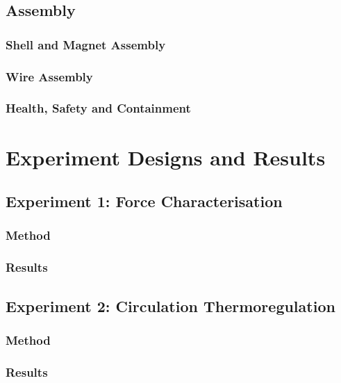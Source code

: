 \documentclass[a4paper,12pt]{article}
\begin{document}
\subsection{Assembly}

\subsubsection{Shell and Magnet Assembly}

\subsubsection{Wire Assembly}

\subsubsection{Health, Safety and Containment}

\newpage

\section{Experiment Designs and Results}

\subsection{Experiment 1: Force Characterisation}

\subsubsection{Method}

\subsubsection{Results}

\subsection{Experiment 2: Circulation Thermoregulation}

\subsubsection{Method}

\subsubsection{Results}
\end{document}
